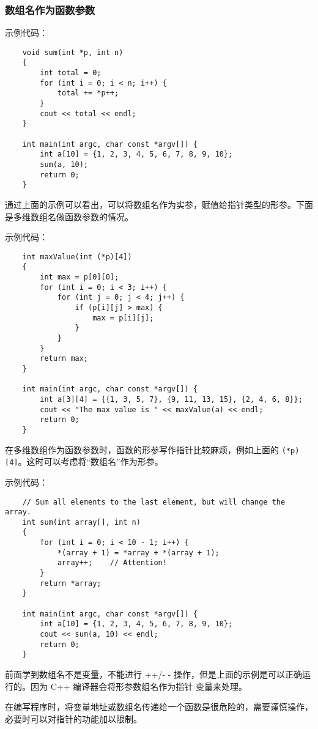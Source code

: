 \documentclass[UTF8]{ctexart}
\begin{document}
\subsubsection{数组名作为函数参数}
示例代码：
\begin{verbatim}
    void sum(int *p, int n)
    {
        int total = 0;
        for (int i = 0; i < n; i++) {
            total += *p++;
        }
        cout << total << endl;
    }

    int main(int argc, char const *argv[]) {
        int a[10] = {1, 2, 3, 4, 5, 6, 7, 8, 9, 10};
        sum(a, 10);
        return 0;
    }
\end{verbatim}

通过上面的示例可以看出，可以将数组名作为实参，赋值给指针类型的形参。下面是多维数组名做函数参数的情况。

示例代码：
\begin{verbatim}
    int maxValue(int (*p)[4])
    {
        int max = p[0][0];
        for (int i = 0; i < 3; i++) {
            for (int j = 0; j < 4; j++) {
                if (p[i][j] > max) {
                    max = p[i][j];
                }
            }
        }
        return max;
    }

    int main(int argc, char const *argv[]) {
        int a[3][4] = {{1, 3, 5, 7}, {9, 11, 13, 15}, {2, 4, 6, 8}};
        cout << "The max value is " << maxValue(a) << endl;
        return 0;
    }
\end{verbatim}

在多维数组作为函数参数时，函数的形参写作指针比较麻烦，例如上面的 \texttt{(*p)[4]}。这时可以考虑将“数组名”作为形参。

示例代码：
\begin{verbatim}
    // Sum all elements to the last element, but will change the array.
    int sum(int array[], int n)
    {
        for (int i = 0; i < 10 - 1; i++) {
            *(array + 1) = *array + *(array + 1);
            array++;    // Attention!
        }
        return *array;
    }

    int main(int argc, char const *argv[]) {
        int a[10] = {1, 2, 3, 4, 5, 6, 7, 8, 9, 10};
        cout << sum(a, 10) << endl;
        return 0;
    }
\end{verbatim}

前面学到数组名不是变量，不能进行 ++/- - 操作，但是上面的示例是可以正确运行的。因为 C++ 编译器会将形参数组名作为指针
变量来处理。

在编写程序时，将变量地址或数组名传递给一个函数是很危险的，需要谨慎操作，必要时可以对指针的功能加以限制。
\end{document}
